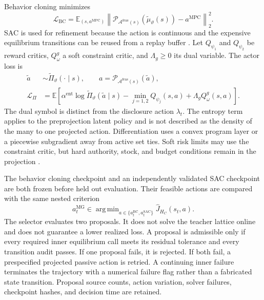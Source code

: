 \documentclass[a4paper,fleqn]{cas-sc}
\newcommand{\E}{\mathbb{E}}
\DeclareMathOperator*{\argmin}{arg\,min}
\newcommand{\norm}[1]{\left\lVert #1 \right\rVert}
\begin{document}
Behavior cloning minimizes
\begin{equation}
 \mathcal L_{\mathrm{BC}}=
 \E_{(s,a^{\mathrm{MPC}})}
 \norm{
 \mathcal P_{\mathcal A^{\mathrm{feas}}(s)}
 (\widetilde\mu_\vartheta(s))-a^{\mathrm{MPC}}
 }_2^2.
 \label{eq:behavior-cloning}
\end{equation}
SAC is used for refinement because the action is continuous and the expensive
equilibrium transitions can be reused from a replay buffer
\citep{HaarnojaEtAl2018}. Let $Q_{\psi_1}$ and $Q_{\psi_2}$ be reward critics,
$Q^g_\omega$ a soft constraint critic, and $\Lambda_g\ge0$ its dual variable.
The actor loss is
\begin{equation}
\begin{aligned}
 \widetilde a&\sim\widetilde\Pi_\vartheta(\cdot\mid s),\qquad
 a=\mathcal P_{\mathcal A^{\mathrm{feas}}(s)}(\widetilde a),\\
 \mathcal L_{\Pi}
 &=\E\left[
 \alpha^{\mathrm{ent}}
 \log\widetilde\Pi_\vartheta(\widetilde a\mid s)
 -\min_{j=1,2}Q_{\psi_j}(s,a)
 +\Lambda_g Q^g_\omega(s,a)
 \right].
\end{aligned}
\label{eq:constrained-sac-loss}
\end{equation}
The dual symbol is distinct from the disclosure action $\lambda_t$. The entropy
term applies to the preprojection latent policy and is not described as the
density of the many to one projected action. Differentiation uses a convex
program layer or a piecewise subgradient away from active set ties. Soft risk
limits may use the constraint critic, but hard authority, stock, and budget
conditions remain in the projection \citep{AchiamEtAl2017}.

The behavior cloning checkpoint and an independently validated SAC checkpoint
are both frozen before held out evaluation. Their feasible actions are compared
with the same nested criterion
\begin{equation}
 a_t^{\mathrm{MG}}\in
 \argmin_{a\in\{a_t^{\mathrm{BC}},a_t^{\mathrm{SAC}}\}}
 \widehat J_{H_C}(s_t,a).
 \label{eq:two-proposal-selector}
\end{equation}
The selector evaluates two proposals. It does not solve the teacher lattice
online and does not guarantee a lower realized loss. A proposal is admissible
only if every required inner equilibrium call meets its residual tolerance and
every transition audit passes. If one proposal fails, it is rejected. If both
fail, a prespecified projected passive action is retried. A continuing inner
failure terminates the trajectory with a numerical failure flag rather than a
fabricated state transition. Proposal source counts, action variation, solver
failures, checkpoint hashes, and decision time are retained.
\end{document}
